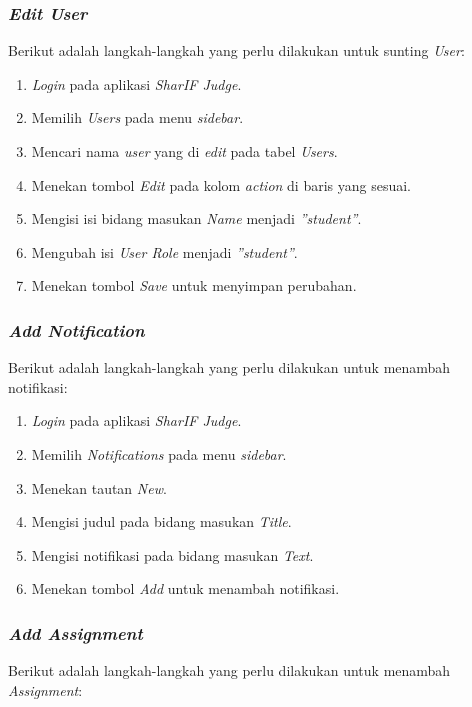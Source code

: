 \subsubsection{\textit{Edit User}}
\label{subsubsec:skenario_edit_user}
Berikut adalah langkah-langkah yang perlu dilakukan untuk sunting \textit{User}:

\begin{enumerate}
	\item \textit{Login} pada aplikasi \textit{SharIF Judge}.
	\item Memilih \textit{Users} pada menu \textit{sidebar}.
	\item Mencari nama \textit{user} yang di \textit{edit} pada tabel \textit{Users}.
	\item Menekan tombol \textit{Edit} pada kolom \textit{action} di baris yang sesuai.
	\item Mengisi isi bidang masukan \textit{Name} menjadi \textit{''student''}.
	\item Mengubah isi \textit{User Role} menjadi \textit{''student''}. 
	\item Menekan tombol \textit{Save} untuk menyimpan perubahan.
\end{enumerate}	

\subsubsection{\textit{Add Notification}}
\label{subsubsec:skenario_add_notification}
Berikut adalah langkah-langkah yang perlu dilakukan untuk menambah notifikasi:

\begin{enumerate}
	\item \textit{Login} pada aplikasi \textit{SharIF Judge}.
	\item Memilih \textit{Notifications} pada menu \textit{sidebar}.
	\item Menekan tautan \textit{New}.
	\item Mengisi judul pada bidang masukan \textit{Title}.
	\item Mengisi notifikasi pada bidang masukan \textit{Text}.
	\item Menekan tombol \textit{Add} untuk menambah notifikasi.
\end{enumerate}

\subsubsection{\textit{Add Assignment}}
\label{subsubsec:skenario_add_assignment}
Berikut adalah langkah-langkah yang perlu dilakukan untuk menambah \textit{Assignment}:

